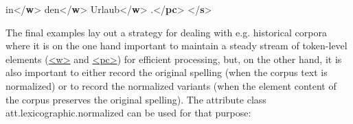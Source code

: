 \begin{shaded}
in{</\textbf{w}>}\mbox{}\newline 
{}den{</\textbf{w}>}\mbox{}\newline 
{}Urlaub{</\textbf{w}>}\mbox{}\newline 
{}.{</\textbf{pc}>}\mbox{}\newline 
{</\textbf{s}>}\end{shaded}\egroup\par \par
The final examples lay out a strategy for dealing with e.g. historical corpora where it is on the one hand important to maintain a steady stream of token-level elements (\hyperref[TEI.w]{<w>} and \hyperref[TEI.pc]{<pc>}) for efficient processing, but, on the other hand, it is also important to either record the original spelling (when the corpus text is normalized) or to record the normalized variants (when the element content of the corpus preserves the original spelling). The attribute class \textsf{att.lexicographic.normalized} can be used for that purpose: 
